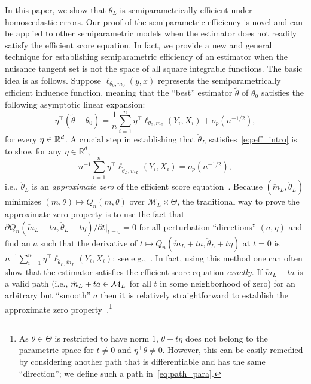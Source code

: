 

In this paper, we show that $\check{\theta}_L$ is semiparametrically efficient under homoscedastic errors. Our proof of the semiparametric efficiency is novel and can be applied to other semiparametric models when the estimator does not readily satisfy the efficient score equation. In fact, we provide a new and general technique for establishing semiparametric efficiency of an estimator when the nuisance tangent set is not the space of all square integrable functions. The basic idea is as follows. Suppose $\ell_{\theta_0, m_0}(y, x)$ represents the semiparametrically efficient influence function, meaning that the ``best'' estimator $\tilde{\theta}$ of $\theta_0$ satisfies the following asymptotic linear expansion:
\begin{equation}\label{eq:eff_intro}
\eta^\top (\tilde{\theta} - \theta_0) = \frac{1}{n}\sum_{i=1}^n \eta^\top \ell_{\theta_0, m_0}(Y_i, X_i) + o_p(n^{-1/2}),
\end{equation}
for every $\eta\in \mathbb{R}^d$. A crucial step in establishing that $\check{\theta}_L$ satisfies~\eqref{eq:eff_intro} is to show for any $\eta\in\mathbb{R}^d$,
\[n^{-1}\sum_{i=1}^n  \eta^{\top}\ell_{\check{\theta}_L, \check{m}_L}(Y_i, X_i) = o_p(n^{-1/2}),\]
 i.e., $\check{\theta}_L$ is an \emph{approximate zero} of the efficient score equation~\cite[Theorem 6.20]{VdV02}. Because $(\check{m}_L,\check{\theta}_L)$ minimizes $(m,\theta) \mapsto Q_n(m,\theta)$ over $\mathcal{M}_L\times\Theta$, the traditional way to prove the approximate zero property is to use the fact that $\partial Q_n(\check{m}_L + t a, \check{\theta}_L + t\eta)/\partial t|_{t = 0} =0$ for all perturbation ``directions'' $(a, \eta)$ and find an $a$ such that the derivative of $t\mapsto Q_n(\check{m}_L + ta, \check{\theta}_L + t\eta)$ at $t=0$  is $n^{-1}\sum_{i=1}^n \eta^\top \ell_{\check{\theta}_L, \check{m}_L}(Y_i, X_i)$; see e.g.,~\cite{NeweyStroker93}. {In fact, using this method one can often show that the estimator satisfies the efficient score equation \textit{exactly}.} If $\check{m}_L+ta$ is a valid path (i.e., $\check{m}_L+ t a \in \mathcal{M}_L$ for all $t$ in some neighborhood of zero) for an arbitrary but ``smooth'' $a$ then it is relatively straightforward to establish the approximate zero property~\citep{NeweyStroker93}.\footnote{ As $\theta\in \Theta$ is restricted to have norm $1$, ${\theta} + t \eta$ does not belong to the parametric space for $t\neq 0$ and $\eta^\top {\theta} \ne 0$. However, this can be easily remedied by considering another path that is differentiable and has the same ``direction''; we define such a path in~\eqref{eq:path_para}.} 
